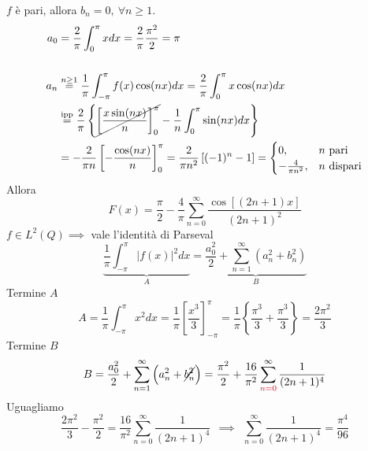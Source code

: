 $f$ è pari, allora $b_{n} = 0,\ \forall n\geq 1$.
\begin{align*}
a_{0} & = \frac{2}{\pi }\int ^{\pi }_{0} xdx = \frac{2}{\pi }\frac{\pi ^{2}}{2} = \pi \\
 & \\
a_{n} & \overset{n\geq 1}{ = }\frac{1}{\pi }\int ^{\pi }_{ - \pi } f(x)\cos(nx) dx = \frac{2}{\pi }\int ^{\pi }_{0} x\cos(nx) dx\\
 & \overset{\text{ipp}}{ = }\frac{2}{\pi }\left\{\cancel{\left[\frac{x\sin(nx)}{n}\right]^{\pi }_{0}} - \frac{1}{n}\int ^{\pi }_{0}\sin(nx) dx\right\}\\
 & = - \frac{2}{\pi n}\left[ - \frac{\cos(nx)}{n}\right]^{\pi }_{0} = \frac{2}{\pi n^{2}}\left[(- 1)^{n} - 1\right] = \begin{cases}
0, & n\ \text{pari}\\
- \frac{4}{\pi n^{2}} , & n\ \text{dispari}
\end{cases}
\end{align*}
Allora
\begin{equation*}
F(x) = \frac{\pi }{2} - \frac{4}{\pi }\sum\limits ^{\infty }_{n = 0}\frac{\cos[(2n + 1) x]}{(2n + 1)^{2}}
\end{equation*}
$f\in L^{2}(Q) \implies $ vale l'identità di Parseval
\begin{equation*}
\underbrace{\frac{1}{\pi }\int ^{\pi }_{ - \pi }| f(x)| ^{2} dx}_{A} = \underbrace{\frac{a^{2}_{0}}{2} + \sum\limits ^{\infty }_{n = 1}\left(a^{2}_{n} + b^{2}_{n}\right)}_{B}
\end{equation*}
Termine $A$
\begin{equation*}
A = \frac{1}{\pi }\int ^{\pi }_{ - \pi } x^{2} dx = \frac{1}{\pi }\left[\frac{x^{3}}{3}\right]^{\pi }_{ - \pi } = \frac{1}{\pi }\left\{\frac{\pi ^{3}}{3} + \frac{\pi ^{3}}{3}\right\} = \frac{2\pi ^{2}}{3}
\end{equation*}
Termine $B$
\begin{equation*}
B = \frac{a^{2}_{0}}{2} + \sum\limits ^{\infty }_{n = 1}\left(a^{2}_{n} + \cancel{b^{2}_{n}}\right) = \frac{\pi ^{2}}{2} + \frac{16}{\pi ^{2}}\sum\limits ^{\infty }_{\textcolor[rgb]{0.82,0.01,0.11}{n = 0}}\frac{1}{(2n + 1)^{4}}
\end{equation*}
Uguagliamo
\begin{equation*}
\frac{2\pi ^{2}}{3} - \frac{\pi ^{2}}{2} = \frac{16}{\pi ^{2}}\sum\limits ^{\infty }_{n = 0}\frac{1}{(2n + 1)^{4}} \ \ \implies \ \ \sum\limits ^{\infty }_{n = 0}\frac{1}{(2n + 1)^{4}} = \frac{\pi ^{4}}{96}
\end{equation*}
